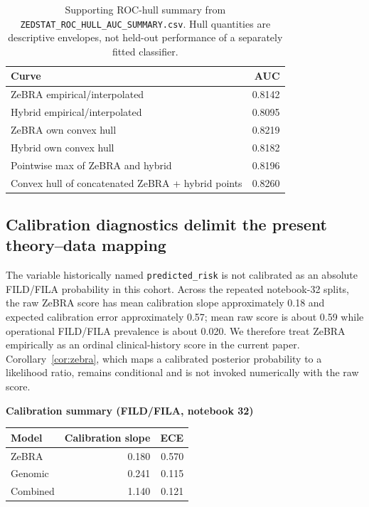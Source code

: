 {\figLowFPRGeometry

\begin{table}[!t]
\caption{Supporting ROC-hull summary from \texttt{ZEDSTAT\_ROC\_HULL\_AUC\_SUMMARY.csv}. Hull quantities are descriptive envelopes, not held-out performance of a separately fitted classifier.}
\label{tab:hull-summary}\centering\footnotesize
\begin{tabular}{lr}
\toprule
Curve & AUC\\
\midrule
ZeBRA empirical/interpolated & 0.8142\\
Hybrid empirical/interpolated & 0.8095\\
ZeBRA own convex hull & 0.8219\\
Hybrid own convex hull & 0.8182\\
Pointwise max of ZeBRA and hybrid & 0.8196\\
Convex hull of concatenated ZeBRA + hybrid points & 0.8260\\
\bottomrule
\end{tabular}
\end{table}

\subsection{Calibration diagnostics delimit the present theory--data mapping}
The variable historically named \texttt{predicted\_risk} is not calibrated as an absolute FILD/FILA probability in this cohort. Across the repeated notebook-32 splits, the raw ZeBRA score has mean calibration slope approximately 0.18 and expected calibration error approximately 0.57; mean raw score is about 0.59 while operational FILD/FILA prevalence is about 0.020. We therefore treat ZeBRA empirically as an ordinal clinical-history score in the current paper. Corollary~\ref{cor:zebra}, which maps a calibrated posterior probability to a likelihood ratio, remains conditional and is not invoked numerically with the raw score.

\par\smallskip
\noindent\begin{minipage}{\columnwidth}
\centering\scriptsize
\textbf{Calibration summary (FILD/FILA, notebook 32)}\\[2pt]
\begin{tabular}{lrr}
\toprule
Model & Calibration slope & ECE\\
\midrule
ZeBRA & 0.180 & 0.570\\
Genomic & 0.241 & 0.115\\
Combined & 1.140 & 0.121\\
\bottomrule
\end{tabular}
\end{minipage}
\par\smallskip

}
